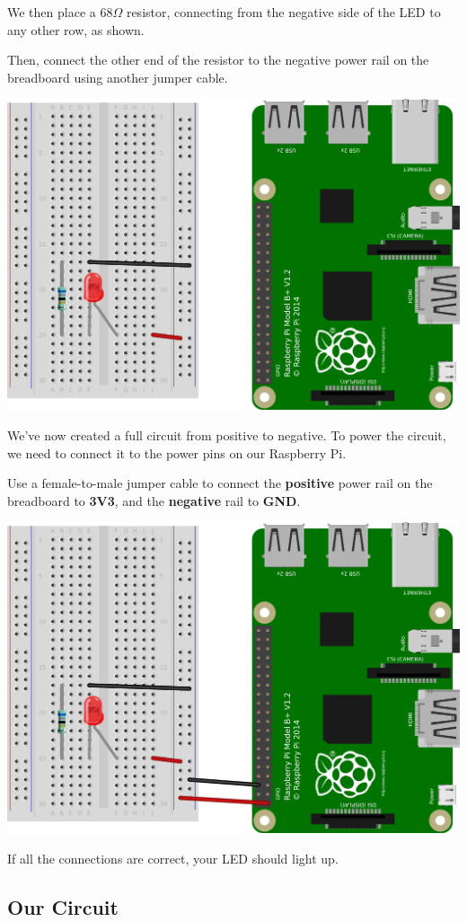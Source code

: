 	We then place a $68 \Omega$ resistor, connecting from the negative side of the LED to any other row, as shown.
	
	Then, connect the other end of the resistor to the negative power rail on the breadboard using another jumper cable.

	\begin{center}
		\includegraphics[width=0.7\linewidth]{McrRaspJam/015_GPIOZero/1_simplecircuit/4}
	\end{center}

	We've now created a full circuit from positive to negative. To power the circuit, we need to connect it to the power pins on our Raspberry Pi.
	
	Use a female-to-male jumper cable to connect the \textbf{positive} power rail on the breadboard to \textbf{3V3}, and the \textbf{negative} rail to \textbf{GND}.

	\begin{center}
		\includegraphics[width=0.7\linewidth]{McrRaspJam/015_GPIOZero/1_simplecircuit/5}
	\end{center}

	If all the connections are correct, your LED should light up.
	
	\subsection*{Our Circuit}
	
